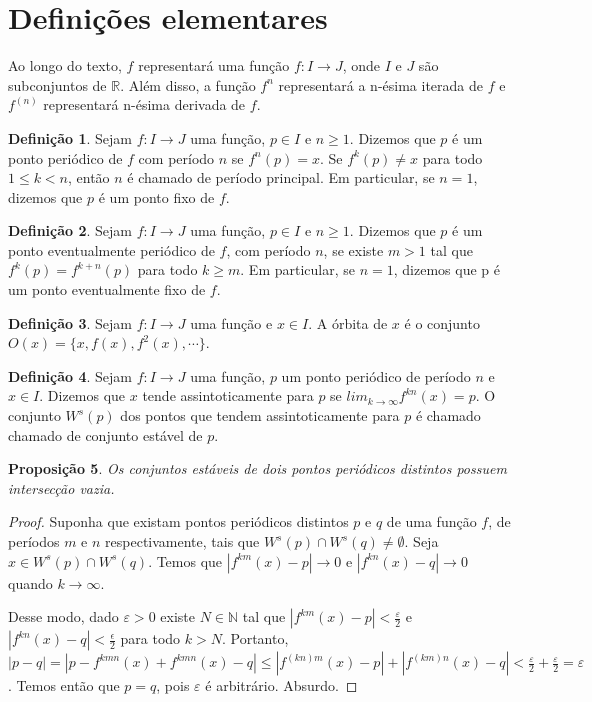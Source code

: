 \documentclass[a4paper, 12pt]{article}
\theoremstyle{definition}
\newtheorem{definition}{Definição}[section]
\theoremstyle{plain}
\newtheorem{proposition}[definition]{Proposição}
\theoremstyle{plain}
\theoremstyle{plain}
\theoremstyle{remark}
\newcommand{\RR}{\mathbb{R}}
\newcommand{\NN}{\mathbb{N}}
\begin{document}
\section{Definições elementares}

Ao longo do texto, $f$ representará uma função $f: I \rightarrow J$, onde $I$ e $J$ são subconjuntos de $\RR$. Além disso, a função $f^n$ representará a n-ésima iterada de $f$ e $f^{(n)}$ representará n-ésima derivada de $f$.
 
\begin{definition}
Sejam $f: I \rightarrow J$ uma função, $p \in I$ e $n \geq 1$.  Dizemos que $p$ é um ponto periódico de $f$ com período $n$ se $f^n(p) = x$. Se $f^k(p) \neq x$ para todo $1 \leq k < n$, então $n$ é chamado de período principal. Em particular, se $n=1$, dizemos que $p$ é um ponto fixo de $f$.
\end{definition}

\begin{definition}
Sejam $f: I \rightarrow J$ uma função, $p \in I$ e $n \geq 1$. Dizemos que $p$ é um ponto eventualmente periódico de $f$, com período $n$, se existe $m > 1$ tal que $f^k(p) = f^{k+n}(p)$ para todo $k \geq m$. Em particular, se $n = 1$, dizemos que p é um ponto eventualmente fixo de $f$.
\end{definition}

\begin{definition}
Sejam $f:I \rightarrow J$ uma função e $x \in I$. A órbita de $x$ é o conjunto $O(x) = \lbrace x, f(x), f^2(x), \cdots \rbrace$.
\end{definition}

\begin{definition}
Sejam $f: I \rightarrow J$ uma função, $p$ um ponto periódico de período $n$ e $x \in I$. Dizemos que $x$ tende assintoticamente para $p$ se $lim_{k \rightarrow \infty} f^{kn}(x) = p$. O conjunto $W^s(p)$ dos pontos que tendem assintoticamente para $p$ é chamado chamado de conjunto estável de $p$.
\end{definition}

\begin{proposition}
Os conjuntos estáveis de dois pontos periódicos distintos possuem intersecção vazia.
\end{proposition}

\begin{proof}
Suponha que existam pontos periódicos distintos $p$ e $q$ de uma função $f$, de períodos $m$ e $n$ respectivamente, tais que $W^s(p) \cap W^s(q) \neq \emptyset$. Seja $x \in W^s(p) \cap W^s(q)$. Temos que $|f^{km}(x) - p| \rightarrow 0$ e $|f^{kn}(x) - q| \rightarrow 0$ quando $k \rightarrow \infty$.

Desse modo, dado $\varepsilon > 0$ existe $N \in \NN$ tal que $|f^{km}(x) - p| < \frac{\varepsilon}{2}$ e $|f^{kn}(x) - q| < \frac{\epsilon}{2}$ para todo $k > N$. Portanto, $|p - q| = |p - f^{kmn}(x) + f^{kmn}(x) - q| \leq |f^{(kn)m}(x) - p| + |f^{(km)n}(x) - q| < \frac{\varepsilon}{2} + \frac{\varepsilon}{2} = \varepsilon$. Temos então que $p = q$, pois $\varepsilon$ é arbitrário. Absurdo.
\end{proof}
\end{document}
